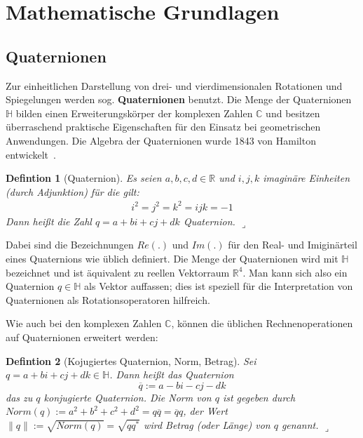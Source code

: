 \newtheorem{defdef}{Defintion}[section]
\newenvironment{definition}[1][]{\begin{defdef}[#1] \normalfont\hspace*{1mm}}{\hfill $\lrcorner$\end{defdef}\vspace{0.2cm}}

\section{Mathematische Grundlagen}
\subsection{Quaternionen}\label{quaternionen}
Zur einheitlichen Darstellung von drei- und vierdimensionalen Rotationen und Spiegelungen werden
sog. \textbf{Quaternionen} benutzt.
Die Menge der Quaternionen $\mathbb{H}$ bilden einen Erweiterungskörper der komplexen Zahlen $\mathbb{C}$ und besitzen überraschend praktische Eigenschaften für den Einsatz bei geometrischen Anwendungen. Die Algebra der Quaternionen wurde 1843 von Hamilton entwickelt~\cite{hazewinkel2004algebras}.

\begin{definition}[Quaternion]
Es seien $a,b,c,d \in \mathbb{R}$ und $i,j,k$ imaginäre Einheiten (durch Adjunktion) für die gilt:
\begin{equation*}\begin{split}
i^2 = j^2 = k^2 = ijk = -1
\end{split}\end{equation*}
Dann heißt die Zahl $q = a + bi + cj + dk$ Quaternion.
\end{definition}
Dabei sind die Bezeichnungen $Re(.)$ und $Im(.)$ für den Real- und Imiginärteil eines Quaternions wie üblich definiert.
Die Menge der Quaternionen wird mit $\mathbb{H}$ bezeichnet und ist äquivalent zu reellen Vektorraum $\mathbb{R}^4$.
Man kann sich also ein Quaternion $q \in \mathbb{H}$ als Vektor auffassen; dies ist speziell für die Interpretation
von Quaternionen als Rotationsoperatoren hilfreich.

Wie auch bei den komplexen Zahlen $\mathbb{C}$, können die üblichen Rechnenoperationen auf Quaternionen erweitert werden:

\begin{definition}[Kojugiertes Quaternion, Norm, Betrag]
Sei $q = a + bi + cj + dk \in \mathbb{H}$. Dann heißt das Quaternion
\begin{equation*}
\overline{q} := a - bi - cj - dk
\end{equation*} das zu $q$ konjugierte Quaternion.
Die Norm von $q$ ist gegeben durch $Norm(q) := a^2 + b^2 + c^2 + d^2 = q\overline{q} = \overline{q}q$, der Wert
$\| q \| := \sqrt{Norm(q)} = \sqrt{q q^*}$ wird Betrag (oder Länge) von $q$ genannt.
\end{definition}

